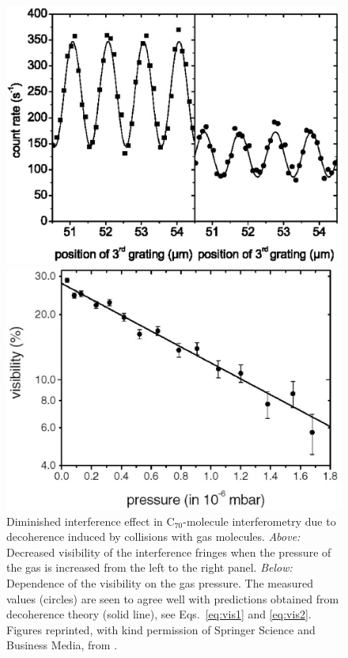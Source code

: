 \documentclass[twocolumn,aps,floatfix,amsmath,amssymb,showpacs,nofootinbib]{revtex4}
\begin{document}
\begin{figure}
\begin{center}
  \includegraphics[scale=.37]{c70-dec-n.eps}

\vspace{.5cm}

  \includegraphics[scale=.37]{c70-vis-n.eps}
\end{center}
\caption[Diminished interference effect in
C$_{70}$-molecule interferometry due to collisional
decoherence]{\label{fig:c70-dec} Diminished interference effect in
  C$_{70}$-molecule interferometry due to decoherence induced by
  collisions with gas molecules. {\em Above:} Decreased visibility of
  the interference fringes when the pressure of the gas is increased
  from the left to the right panel. {\em Below:} Dependence of the
  visibility on the gas pressure. The measured values (circles) are
  seen to agree well with predictions obtained from decoherence theory
  (solid line), see Eqs.~\eqref{eq:vis1} and \eqref{eq:vis2}. Figures
  reprinted, with kind permission of Springer Science and Business
  Media, from \cite{Hackermuller:2003:uu}.}
\end{figure}
\end{document}
